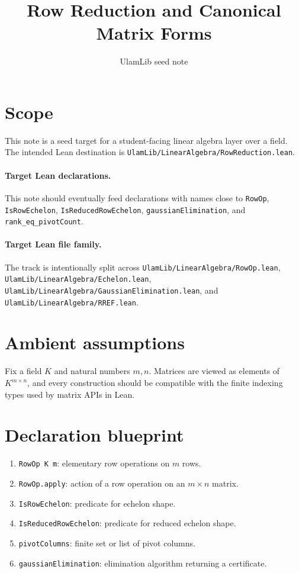 \documentclass[11pt]{article}
\title{Row Reduction and Canonical Matrix Forms}
\author{UlamLib seed note}
\date{}
\begin{document}
\maketitle

\section{Scope}

This note is a seed target for a student-facing linear algebra layer over a
field. The intended Lean destination is
\texttt{UlamLib/LinearAlgebra/RowReduction.lean}.

\paragraph{Target Lean declarations.}
This note should eventually feed declarations with names close to
\texttt{RowOp}, \texttt{IsRowEchelon}, \texttt{IsReducedRowEchelon},
\texttt{gaussianElimination}, and \texttt{rank\_eq\_pivotCount}.

\paragraph{Target Lean file family.}
The track is intentionally split across
\texttt{UlamLib/LinearAlgebra/RowOp.lean},
\texttt{UlamLib/LinearAlgebra/Echelon.lean},
\texttt{UlamLib/LinearAlgebra/GaussianElimination.lean}, and
\texttt{UlamLib/LinearAlgebra/RREF.lean}.

\section{Ambient assumptions}

Fix a field $K$ and natural numbers $m,n$. Matrices are viewed as elements of
$K^{m \times n}$, and every construction should be compatible with the finite
indexing types used by matrix APIs in Lean.

\section{Declaration blueprint}

\begin{enumerate}
\item \texttt{RowOp K m}: elementary row operations on $m$ rows.
\item \texttt{RowOp.apply}: action of a row operation on an $m \times n$
matrix.
\item \texttt{IsRowEchelon}: predicate for echelon shape.
\item \texttt{IsReducedRowEchelon}: predicate for reduced echelon shape.
\item \texttt{pivotColumns}: finite set or list of pivot columns.
\item \texttt{gaussianElimination}: elimination algorithm returning a
certificate.
\end{enumerate}
\end{document}
